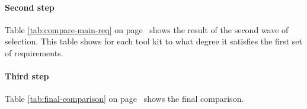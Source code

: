 \paragraph{Second step} Table \ref{tab:compare-main-req} on page~\pageref{tab:compare-main-req} shows the result of 
the second wave of selection. This table shows for each tool kit to what degree it
satisfies the first set of requirements. 

\paragraph{Third step} Table \ref{tab:final-comparison} on page~\pageref{tab:final-comparison} shows
the final comparison. 
